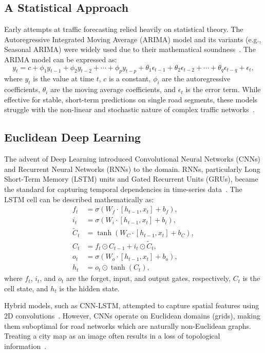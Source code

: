 \documentclass[11pt, a4paper]{article}
\begin{document}
\subsection{A Statistical Approach}
Early attempts at traffic forecasting relied heavily on statistical theory. The Autoregressive Integrated Moving Average (ARIMA) model and its variants (e.g., Seasonal ARIMA) were widely used due to their mathematical soundness~\cite{williams2003modeling}. The ARIMA model can be expressed as:
\begin{equation}
  y_t = c + \phi_1 y_{t-1} + \phi_2 y_{t-2} + \cdots + \phi_p y_{t-p} + \theta_1 \epsilon_{t-1} + \theta_2 \epsilon_{t-2} + \cdots + \theta_q \epsilon_{t-q} + \epsilon_t,
\end{equation}
where \(y_t\) is the value at time \(t\), \(c\) is a constant, \(\phi_i\) are the autoregressive coefficients, \(\theta_i\) are the moving average coefficients, and \(\epsilon_t\) is the error term. While effective for stable, short-term predictions on single road segments, these models struggle with the non-linear and stochastic nature of complex traffic networks~\cite{lv2014traffic}. 

\subsection{Euclidean Deep Learning}
The advent of Deep Learning introduced Convolutional Neural Networks (CNNs) and Recurrent Neural Networks (RNNs) to the domain. RNNs, particularly Long Short-Term Memory (LSTM) units and Gated Recurrent Units (GRUs), became the standard for capturing temporal dependencies in time-series data~\cite{hochreiter1997long,cho2014learning}. The LSTM cell can be described mathematically as:
\begin{align}
  f_t &= \sigma(W_f \cdot [h_{t-1}, x_t] + b_f), \\
  i_t &= \sigma(W_i \cdot [h_{t-1}, x_t] + b_i), \\
  \tilde{C}_t &= \tanh(W_C \cdot [h_{t-1}, x_t] + b_C), \\
  C_t &= f_t \odot C_{t-1} + i_t \odot \tilde{C}_t, \\
  o_t &= \sigma(W_o \cdot [h_{t-1}, x_t] + b_o), \\
  h_t &= o_t \odot \tanh(C_t),
\end{align}
where \(f_t\), \(i_t\), and \(o_t\) are the forget, input, and output gates, respectively, \(C_t\) is the cell state, and \(h_t\) is the hidden state.

Hybrid models, such as CNN-LSTM, attempted to capture spatial features using 2D convolutions~\cite{yao2018deep}. However, CNNs operate on Euclidean domains (grids), making them suboptimal for road networks which are naturally non-Euclidean graphs. Treating a city map as an image often results in a loss of topological information~\cite{bronstein2017geometric}.
\end{document}
